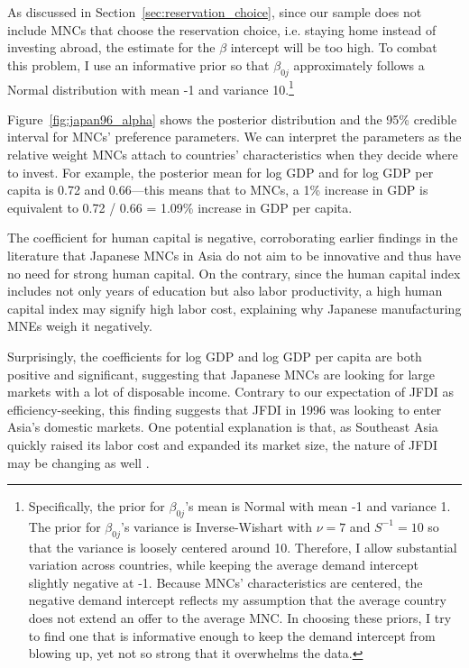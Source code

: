 As discussed in Section~\ref{sec:reservation_choice}, since our sample does not
include MNCs that choose the reservation choice, i.e. staying home instead of
investing abroad, the estimate for the $\beta$ intercept will be too high. To
combat this problem, I use an informative prior so that $\beta_{0j}$
approximately follows a Normal distribution with mean -1 and variance
10.\footnote{Specifically, the prior for $\beta_{0j}$'s mean is Normal with mean
  -1 and variance 1. The prior for $\beta_{0j}$'s variance is Inverse-Wishart
  with $\nu = 7$ and $S^{-1} = 10$ so that the variance is loosely centered
  around 10. Therefore, I allow substantial variation across countries, while
  keeping the average demand intercept slightly negative at -1. Because MNCs'
  characteristics are centered, the negative demand intercept reflects my
  assumption that the average country does not extend an offer to the average
  MNC. In choosing these priors, I try to find one that is informative enough to
  keep the demand intercept from blowing up, yet not so strong that it
  overwhelms the data.}

Figure~\ref{fig:japan96_alpha} shows the posterior distribution and the 95\%
credible interval for MNCs' preference parameters. We can interpret the
parameters as the relative weight MNCs attach to countries' characteristics when
they decide where to invest. For example, the posterior mean for log GDP and for
log GDP per capita is 0.72 and 0.66---this means that to MNCs, a 1\% increase in
GDP is equivalent to 0.72 / 0.66 = 1.09\% increase in GDP per capita.

The coefficient for human capital
is negative, corroborating earlier findings in the literature that Japanese MNCs
in Asia do not aim to be innovative and thus have no need for strong human
capital. On the contrary, since the human capital index includes not only years
of education but also labor productivity, a high human capital index may signify
high labor cost, explaining why Japanese manufacturing MNEs weigh it negatively.

Surprisingly, the coefficients for log GDP and log GDP per capita are both positive and
significant, suggesting that Japanese MNCs are looking for large markets with a
lot of disposable income. Contrary to our expectation of JFDI as
efficiency-seeking, this finding suggests that JFDI in 1996 was looking to enter
Asia's domestic markets. One potential explanation is that, as Southeast Asia
quickly raised its labor cost and expanded its market size, the nature of JFDI
may be changing as well \citep[44]{Jomo2003}.

